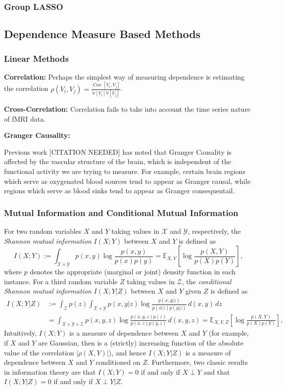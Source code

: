 \documentclass[11pt]{article}
\newcommand{\E}{\mathbb{E}} %
\newcommand{\X}{\mathcal{X}}
\newcommand{\Y}{\mathcal{Y}}
\newcommand{\Z}{\mathcal{Z}}
\newcommand{\Var}{\mathbb{V}} %
\begin{document}
\subsubsection{Group LASSO}

\subsection{Dependence Measure Based Methods}
\subsubsection{Linear Methods}
{\bf Correlation:} Perhaps the simplest way of measuring dependence is
estimating the correlation
$\rho(V_i,V_j) = \frac{\operatorname{Cov}[V_i,V_j]}{\Var[V_i]\Var[V_j]}$.

{\bf Cross-Correlation:} Correlation fails to take into account the time series
nature of fMRI data.

{\bf Granger Causality:}

Previous work [CITATION NEEDED] has noted that Granger Causality is affected by
the vascular structure of the brain, which is independent of the functional
activity we are trying to measure. For example, certain brain regions which
serve as oxygenated blood sources tend to appear as Granger causal, while
regions which serve as blood sinks tend to appear as Granger consequentail.

\subsubsection{Mutual Information and Conditional Mutual Information}
For two random variables $X$ and $Y$ taking values in $\X$ and $\Y$,
respectively, the \emph{Shannon mutual information} $I(X;Y)$ between $X$ and
$Y$ is defined as
\[I(X;Y)
    := \int_{\X \times \Y} p(x,y) \log \frac{p(x,y)}{p(x)p(y)}
    = \E_{X,Y} \left[ \log \frac{p(X,Y)}{p(X)p(Y)} \right],
\]
where $p$ denotes the appropriate (marginal or joint) density function in each
instance. For a third random variable $Z$ taking values in $\Z$, the
\emph{conditional Shannon mutual information} $I(X;Y|Z)$ between $X$ and $Y$
given $Z$ is defined as
\begin{align*}
I(X;Y|Z)
 &  := \int_\Z p(z) \int_{\X \times \Y}
                p(x,y|z) \log \frac{p(x,y|z)}{p(x|z)p(y|z)} \, d(x,y) \, dz \\
 &  = \int_{\X \times \Y \times \Z}
                    p(x,y,z) \log \frac{p(x,y,z)p(z)}{p(x,z)p(y,z)} \, d(x,y,z)
    = \E_{X,Y,Z} \left[ \log \frac{p(X,Y)}{p(X)p(Y)} \right],
\end{align*}
Intuitively, $I(X;Y)$ is a measure of dependence between $X$ and $Y$ (for
example, if $X$ and $Y$ are Gaussian, then is a (strictly) increasing function
of the absolute value of the correlation $|\rho(X,Y)|$), and hence $I(X;Y|Z)$
is a measure of dependence between $X$ and $Y$ conditioned on $Z$. Furthermore,
two classic results in information theory are that $I(X;Y) = 0$ if and only if
$X \perp Y$ and that $I(X;Y|Z) = 0$ if and only if $X \perp Y | Z$.
\end{document}
